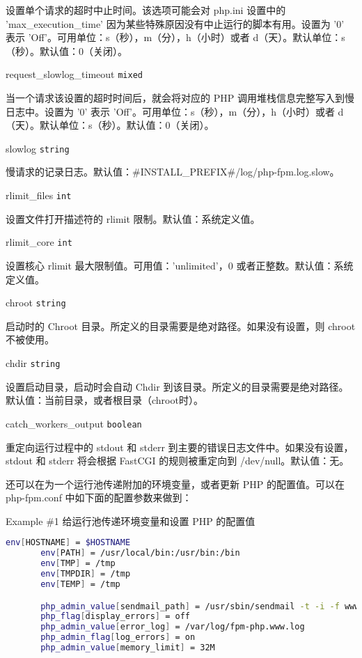 \begin{compactitem}
设置单个请求的超时中止时间。该选项可能会对 php.ini 设置中的 'max\_execution\_time' 因为某些特殊原因没有中止运行的脚本有用。设置为 '0' 表示 'Off'。可用单位：s（秒），m（分），h（小时）或者 d（天）。默认单位：s（秒）。默认值：0（关闭）。

\item request\_slowlog\_timeout \texttt{mixed}

当一个请求该设置的超时时间后，就会将对应的 PHP 调用堆栈信息完整写入到慢日志中。设置为 '0' 表示 'Off'。可用单位：s（秒），m（分），h（小时）或者 d（天）。默认单位：s（秒）。默认值：0（关闭）。

\item slowlog \texttt{string}

慢请求的记录日志。默认值：\#INSTALL\_PREFIX\#/log/php-fpm.log.slow。

\item rlimit\_files \texttt{int}

设置文件打开描述符的 rlimit 限制。默认值：系统定义值。

\item rlimit\_core \texttt{int}

设置核心 rlimit 最大限制值。可用值：'unlimited'，0 或者正整数。默认值：系统定义值。

\item chroot \texttt{string}

启动时的 Chroot 目录。所定义的目录需要是绝对路径。如果没有设置，则 chroot 不被使用。

\item chdir \texttt{string}

设置启动目录，启动时会自动 Chdir 到该目录。所定义的目录需要是绝对路径。默认值：当前目录，或者根目录（chroot时）。

\item catch\_workers\_output \texttt{boolean}

重定向运行过程中的 stdout 和 stderr 到主要的错误日志文件中。如果没有设置，stdout 和 stderr 将会根据 FastCGI 的规则被重定向到 /dev/null。默认值：无。

\end{compactitem}

还可以在为一个运行池传递附加的环境变量，或者更新 PHP 的配置值。可以在 php-fpm.conf 中如下面的配置参数来做到：

Example \#1 给运行池传递环境变量和设置 PHP 的配置值

\begin{lstlisting}[language=bash]
env[HOSTNAME] = $HOSTNAME
       env[PATH] = /usr/local/bin:/usr/bin:/bin
       env[TMP] = /tmp
       env[TMPDIR] = /tmp
       env[TEMP] = /tmp

       php_admin_value[sendmail_path] = /usr/sbin/sendmail -t -i -f www@my.domain.com
       php_flag[display_errors] = off
       php_admin_value[error_log] = /var/log/fpm-php.www.log
       php_admin_flag[log_errors] = on
       php_admin_value[memory_limit] = 32M
\end{lstlisting}


